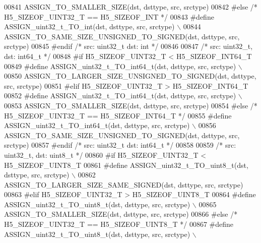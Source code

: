 \begin{DoxyCode}
00841 \textcolor{preprocessor}{        ASSIGN\_TO\_SMALLER\_SIZE(dst, dsttype, src, srctype)}
00842 \textcolor{preprocessor}{#else }\textcolor{comment}{/* H5\_SIZEOF\_UINT32\_T == H5\_SIZEOF\_INT */}\textcolor{preprocessor}{}
00843 \textcolor{preprocessor}{    #define ASSIGN\_uint32\_t\_TO\_int(dst, dsttype, src, srctype) \(\backslash\)}
00844 \textcolor{preprocessor}{        ASSIGN\_TO\_SAME\_SIZE\_UNSIGNED\_TO\_SIGNED(dst, dsttype, src, srctype)}
00845 \textcolor{preprocessor}{#endif }\textcolor{comment}{/* src: uint32\_t dst: int */}\textcolor{preprocessor}{}
00846 
00847 \textcolor{comment}{/* src: uint32\_t, dst: int64\_t */}
00848 \textcolor{preprocessor}{#if H5\_SIZEOF\_UINT32\_T < H5\_SIZEOF\_INT64\_T}
00849 \textcolor{preprocessor}{    #define ASSIGN\_uint32\_t\_TO\_int64\_t(dst, dsttype, src, srctype) \(\backslash\)}
00850 \textcolor{preprocessor}{        ASSIGN\_TO\_LARGER\_SIZE\_UNSIGNED\_TO\_SIGNED(dst, dsttype, src, srctype)}
00851 \textcolor{preprocessor}{#elif H5\_SIZEOF\_UINT32\_T > H5\_SIZEOF\_INT64\_T}
00852 \textcolor{preprocessor}{    #define ASSIGN\_uint32\_t\_TO\_int64\_t(dst, dsttype, src, srctype) \(\backslash\)}
00853 \textcolor{preprocessor}{        ASSIGN\_TO\_SMALLER\_SIZE(dst, dsttype, src, srctype)}
00854 \textcolor{preprocessor}{#else }\textcolor{comment}{/* H5\_SIZEOF\_UINT32\_T == H5\_SIZEOF\_INT64\_T */}\textcolor{preprocessor}{}
00855 \textcolor{preprocessor}{    #define ASSIGN\_uint32\_t\_TO\_int64\_t(dst, dsttype, src, srctype) \(\backslash\)}
00856 \textcolor{preprocessor}{        ASSIGN\_TO\_SAME\_SIZE\_UNSIGNED\_TO\_SIGNED(dst, dsttype, src, srctype)}
00857 \textcolor{preprocessor}{#endif }\textcolor{comment}{/* src: uint32\_t dst: int64\_t */}\textcolor{preprocessor}{}
00858 
00859 \textcolor{comment}{/* src: uint32\_t, dst: uint8\_t */}
00860 \textcolor{preprocessor}{#if H5\_SIZEOF\_UINT32\_T < H5\_SIZEOF\_UINT8\_T}
00861 \textcolor{preprocessor}{    #define ASSIGN\_uint32\_t\_TO\_uint8\_t(dst, dsttype, src, srctype) \(\backslash\)}
00862 \textcolor{preprocessor}{        ASSIGN\_TO\_LARGER\_SIZE\_SAME\_SIGNED(dst, dsttype, src, srctype)}
00863 \textcolor{preprocessor}{#elif H5\_SIZEOF\_UINT32\_T > H5\_SIZEOF\_UINT8\_T}
00864 \textcolor{preprocessor}{    #define ASSIGN\_uint32\_t\_TO\_uint8\_t(dst, dsttype, src, srctype) \(\backslash\)}
00865 \textcolor{preprocessor}{        ASSIGN\_TO\_SMALLER\_SIZE(dst, dsttype, src, srctype)}
00866 \textcolor{preprocessor}{#else }\textcolor{comment}{/* H5\_SIZEOF\_UINT32\_T == H5\_SIZEOF\_UINT8\_T */}\textcolor{preprocessor}{}
00867 \textcolor{preprocessor}{    #define ASSIGN\_uint32\_t\_TO\_uint8\_t(dst, dsttype, src, srctype) \(\backslash\)}

\end{DoxyCode}
